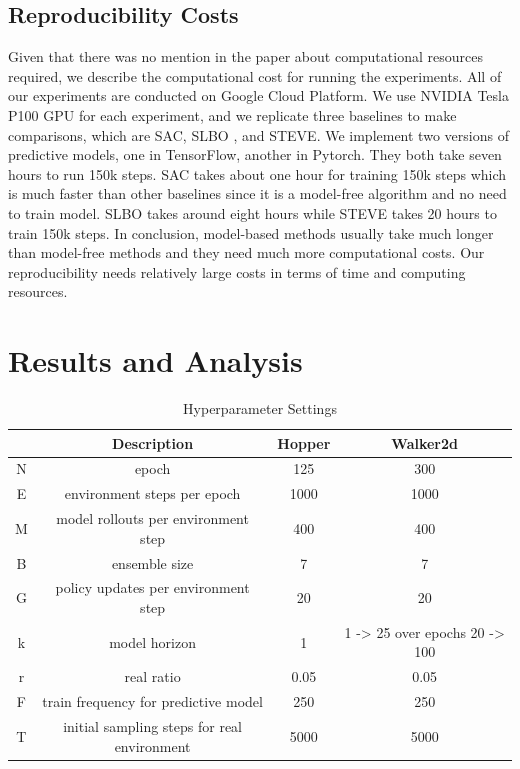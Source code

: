 \subsection{Reproducibility Costs}
Given that there was no mention in the paper about computational resources required, we describe the computational cost for running the experiments. All of our experiments are conducted on Google Cloud Platform. We use NVIDIA Tesla P100 GPU for each experiment, and we replicate three baselines to make comparisons, which are SAC, SLBO \cite{ref10}, and STEVE. We implement two versions of predictive models, one in TensorFlow, another in Pytorch. They both take seven hours to run 150k steps. SAC takes about one hour for training 150k steps which is much faster than other baselines since it is a model-free algorithm and no need to train model. SLBO takes around eight hours while STEVE takes 20 hours to train 150k steps. In conclusion, model-based methods usually take much longer than model-free methods and they need much more computational costs. Our reproducibility needs relatively large costs in terms of time and computing resources.

\section{Results and Analysis}
\begin{table}[h]
  \caption{Hyperparameter Settings}
  \centering
  \begin{tabular}{cccc}
    \toprule
    \cmidrule(r){0-3}
        & Description     & Hopper         & Walker2d   \\
    \midrule
    N   & epoch           & 125               & 300           \\
    E   & environment steps per epoch & 1000               & 1000           \\
    M   & model rollouts per environment step       & 400      &    400           \\
    B   & ensemble size           & 7               & 7           \\
    G   & policy updates per environment step           & 20               & 20           \\ 
    k   & model horizon           &  1              & 1 -> 25 over epochs 20 -> 100           \\
    r   & real ratio           &  0.05             & 0.05           \\
    F   & train frequency for predictive model           &  250             & 250           \\
    T   & initial sampling steps for real environment          &  5000             & 5000           \\
    \bottomrule
  \end{tabular}
\end{table}
